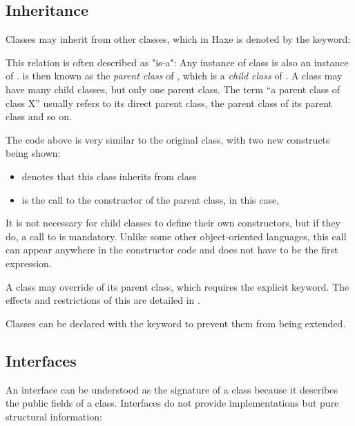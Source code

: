 \subsection{Inheritance}
\label{types-class-inheritance}

Classes may inherit from other classes, which in Haxe is denoted by the  keyword:

This relation is often described as "is-a": Any instance of class  is also an instance of .  is then known as the \emph{parent class} of , which is a \emph{child class} of . A class may have many child classes, but only one parent class. The term ``a parent class of class X'' usually refers to its direct parent class, the parent class of its parent class and so on.

The code above is very similar to the original  class, with two new constructs being shown:
\begin{itemize}
 \item {} denotes that this class inherits from class 
 \item {} is the call to the constructor of the parent class, in this case, 
\end{itemize}
It is not necessary for child classes to define their own constructors, but if they do, a call to  is mandatory. Unlike some other object-oriented languages, this call can appear anywhere in the constructor code and does not have to be the first expression.

A class may override  of its parent class, which requires the explicit  keyword. The effects and restrictions of this are detailed in .


Classes can be declared with the keyword  to prevent them from being extended.



\subsection{Interfaces}
\label{types-interfaces}

An interface can be understood as the signature of a class because it describes the public fields of a class. Interfaces do not provide implementations but pure structural information:

